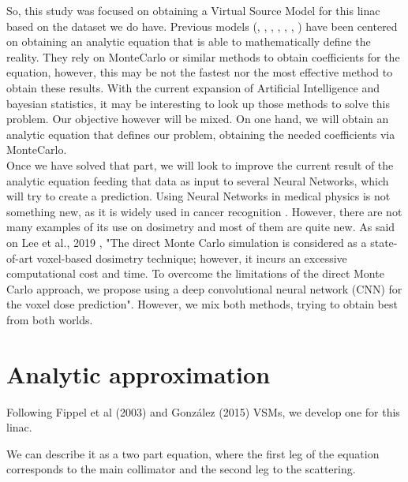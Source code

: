 \documentclass[openany]{article}
\begin{document}
So, this study was focused on obtaining a Virtual Source Model for this linac based on the dataset we do have. Previous models (\cite{BenitesR2012}, \cite{Gonzalez2015}, \cite{Tessonnier}, \cite{10.1007/978-3-642-21198-0_318}, \cite{phdthesis}, \cite{https://doi.org/10.1120/jacmp.v16i1.4992}, \cite{GONZALEZ201716}) have been centered on obtaining an analytic equation that is able to mathematically define the reality. They rely on MonteCarlo or similar methods to obtain coefficients for the equation, however, this may be not the fastest nor the most effective method to obtain these results. With the current expansion of Artificial Intelligence and bayesian statistics, it may be interesting to look up those methods to solve this problem. Our objective however will be mixed. On one hand, we will obtain an analytic equation that defines our problem, obtaining the needed coefficients via MonteCarlo. \\

Once we have solved that part, we will look to improve the current result of the analytic equation feeding that data as input to several Neural Networks, which will try to create a prediction. Using Neural Networks in medical physics is not something new, as it is widely used in cancer recognition \cite{BOTTACI1997469} \cite{Ganesan} \cite{Shen2019}. However, there are not many examples of its use on dosimetry \cite{G_tz_2020} \cite{Jiang} \cite{Lee2019} and most of them are quite new. As said on Lee et al., 2019 \cite{Lee2019}, "The direct Monte Carlo simulation is considered as a state-of-art voxel-based dosimetry technique; however, it incurs an excessive computational cost and time. To overcome the limitations of the direct Monte Carlo approach, we propose using a deep convolutional neural network (CNN) for the voxel dose prediction". However, we mix both methods, trying to obtain best from both worlds.

\newpage
{}

\section{Analytic approximation}


Following Fippel et al (2003) \cite{Fippel} and González (2015) \cite{Gonzalez2015} VSMs, we develop one for this linac.

We can describe it as a two part equation, where the first leg of the equation corresponds to the main collimator and the second leg to the scattering. 
\end{document}
